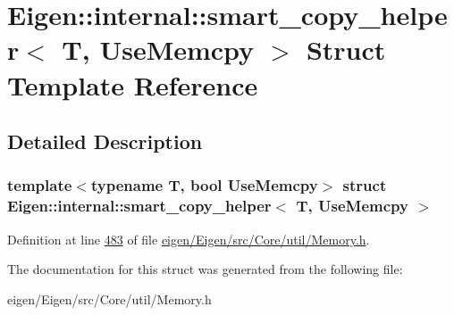 \hypertarget{struct_eigen_1_1internal_1_1smart__copy__helper}{}\section{Eigen\+:\+:internal\+:\+:smart\+\_\+copy\+\_\+helper$<$ T, Use\+Memcpy $>$ Struct Template Reference}
\label{struct_eigen_1_1internal_1_1smart__copy__helper}


\subsection{Detailed Description}
\subsubsection*{template$<$typename T, bool Use\+Memcpy$>$\newline
struct Eigen\+::internal\+::smart\+\_\+copy\+\_\+helper$<$ T, Use\+Memcpy $>$}



Definition at line \hyperlink{eigen_2_eigen_2src_2_core_2util_2_memory_8h_source_l00483}{483} of file \hyperlink{eigen_2_eigen_2src_2_core_2util_2_memory_8h_source}{eigen/\+Eigen/src/\+Core/util/\+Memory.\+h}.



The documentation for this struct was generated from the following file\+:\begin{DoxyCompactItemize}
\item 
eigen/\+Eigen/src/\+Core/util/\+Memory.\+h\end{DoxyCompactItemize}
